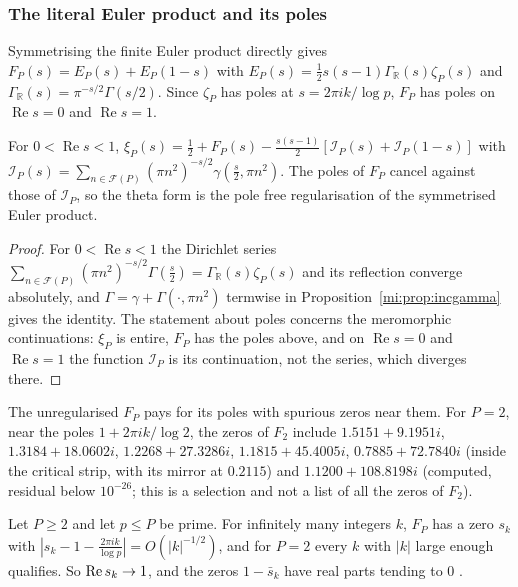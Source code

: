 \subsubsection{The literal Euler product and its poles}

Symmetrising the finite Euler product directly gives $F_P(s)=E_P(s)+E_P(1-s)$ with $E_P(s)=\tfrac12s(s-1)\Gamma_{\mathbb R}(s)\zeta_P(s)$ and $\Gamma_{\mathbb R}(s)=\pi^{-s/2}\Gamma(s/2)$. Since $\zeta_P$ has poles at $s=2\pi ik/\log p$, $F_P$ has poles on $\operatorname{Re}s=0$ and $\operatorname{Re}s=1$.

\begin{proposition}\label{mi:prop:decomp}
For $0<\operatorname{Re}s<1$, $\xi_P(s)=\tfrac12+F_P(s)-\tfrac{s(s-1)}2[\mathcal I_P(s)+\mathcal I_P(1-s)]$ with $\mathcal I_P(s)=\sum_{n\in\mathcal F(P)}(\pi n^2)^{-s/2}\gamma(\tfrac s2,\pi n^2)$. The poles of $F_P$ cancel against those of $\mathcal I_P$, so the theta form is the pole free regularisation of the symmetrised Euler product.
\end{proposition}

\begin{proof}
For $0<\operatorname{Re}s<1$ the Dirichlet series $\sum_{n\in\mathcal F(P)}(\pi n^2)^{-s/2}\Gamma(\tfrac s2)=\Gamma_{\mathbb R}(s)\zeta_P(s)$ and its reflection converge absolutely, and $\Gamma=\gamma+\Gamma(\cdot,\pi n^2)$ termwise in Proposition~\ref{mi:prop:incgamma} gives the identity. The statement about poles concerns the meromorphic continuations: $\xi_P$ is entire, $F_P$ has the poles above, and on $\operatorname{Re}s=0$ and $\operatorname{Re}s=1$ the function $\mathcal I_P$ is its continuation, not the series, which diverges there.
\end{proof}

The unregularised $F_P$ pays for its poles with spurious zeros near them. For $P=2$, near the poles $1+2\pi ik/\log2$, the zeros of $F_2$ include $1.5151+9.1951i$, $1.3184+18.0602i$, $1.2268+27.3286i$, $1.1815+45.4005i$, $0.7885+72.7840i$ (inside the critical strip, with its mirror at $0.2115$) and $1.1200+108.8198i$ (computed, residual below $10^{-26}$; this is a selection and not a list of all the zeros of $F_2$).

\begin{proposition}\label{mi:prop:polezeros}
Let $P\ge2$ and let $p\le P$ be prime. For infinitely many integers $k$, $F_P$ has a zero $s_k$ with $|s_k-1-\frac{2\pi ik}{\log p}|=O(|k|^{-1/2})$, and for $P=2$ every $k$ with $|k|$ large enough qualifies. So $\operatorname{Re} s_k\to1$, and the zeros $1-\bar s_k$ have real parts tending to $0$ \cite{P26gumbelop}.
\end{proposition}

